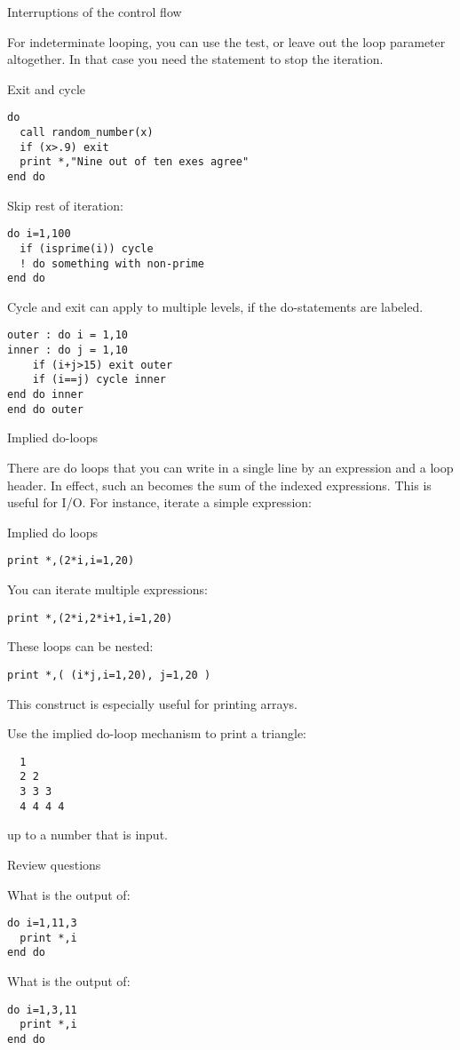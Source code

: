  {Interruptions of the control flow}

For indeterminate looping, you can use the  test,
or leave out the loop parameter altogether.
In that case you need the  statement to stop the iteration.

\begin{block}{Exit and cycle}
  \label{sl:loopexit}
\begin{lstlisting}
do
  call random_number(x)
  if (x>.9) exit
  print *,"Nine out of ten exes agree"
end do
\end{lstlisting}

Skip rest of iteration:
\begin{lstlisting}
do i=1,100
  if (isprime(i)) cycle
  ! do something with non-prime
end do
\end{lstlisting}
\end{block}

Cycle and exit can apply to multiple levels, if the do-statements are
labeled.

\begin{lstlisting}
outer : do i = 1,10
inner : do j = 1,10
    if (i+j>15) exit outer
    if (i==j) cycle inner
end do inner
end do outer
\end{lstlisting}

 {Implied do-loops}
\label{sec:f-impdo}

There are do loops that you can write in a single line by an
expression and a loop header. In effect, such an
 becomes the sum of the indexed
expressions. This is useful
for I/O. For instance, iterate a simple expression:

\begin{block}{Implied do loops}
  \label{sl:implieddo}
\begin{lstlisting}
print *,(2*i,i=1,20)
\end{lstlisting}
You can iterate multiple expressions:
\begin{lstlisting}
print *,(2*i,2*i+1,i=1,20)
\end{lstlisting}
These loops can be nested:
\begin{lstlisting}
print *,( (i*j,i=1,20), j=1,20 )
\end{lstlisting}
\end{block}

This construct is especially useful for printing arrays.

\begin{exercise}
  \label{ex:impl-triangle}
  Use the implied do-loop mechanism to print a triangle:
\begin{lstlisting}
  1
  2 2
  3 3 3
  4 4 4 4
\end{lstlisting}
  up to a number that is input.
\end{exercise}

 {Review questions}

\begin{exercise}
  \label{ex:floop-inf}
  What is the output of:
\begin{lstlisting}
do i=1,11,3
  print *,i
end do
\end{lstlisting}
What is the output of:
\begin{lstlisting}
do i=1,3,11
  print *,i
end do
\end{lstlisting}
\end{exercise}
